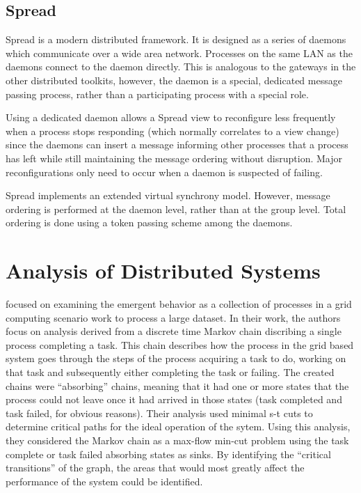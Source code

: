 \subsection{Spread}

Spread\cite{SPREADTOOLKIT} is a modern distributed framework. It is designed as a series of daemons which communicate over a wide area network. Processes on the same LAN as the daemons connect to the daemon directly. This is analogous to the gateways in the other distributed toolkits, however, the daemon is a special, dedicated message passing process, rather than a participating process with a special role.

Using a dedicated daemon allows a Spread view to reconfigure less frequently when a process stops responding (which normally correlates to a view change) since the daemons can insert a message informing other processes that a process has left while still maintaining the message ordering without disruption. Major reconfigurations only need to occur when a daemon is suspected of failing.

Spread implements an extended virtual synchrony model. However, message ordering is performed at the daemon level, rather than at the group level. Total ordering is done using a token passing scheme among the daemons.

\section{Analysis of Distributed Systems}

\cite{markov-distributed} focused on examining the emergent behavior as a collection of processes in a grid computing scenario work to process a large dataset.
In their work, the authors focus on analysis derived from a discrete time Markov chain discribing a single process completing a task.
This chain describes how the process in the grid based system goes through the steps of the process acquiring a task to do, working on that task and subsequently either completing the task or failing.
The created chains were ``absorbing'' chains, meaning that it had one or more states that the process could not leave once it had arrived in those states (task completed and task failed, for obvious reasons).
Their analysis used minimal s-t cuts to determine critical paths for the ideal operation of the sytem.
Using this analysis, they considered the Markov chain as a max-flow min-cut problem using the task complete or task failed absorbing states as sinks.
By identifying the ``critical transitions'' of the graph, the areas that would most greatly affect the performance of the system could be identified.

